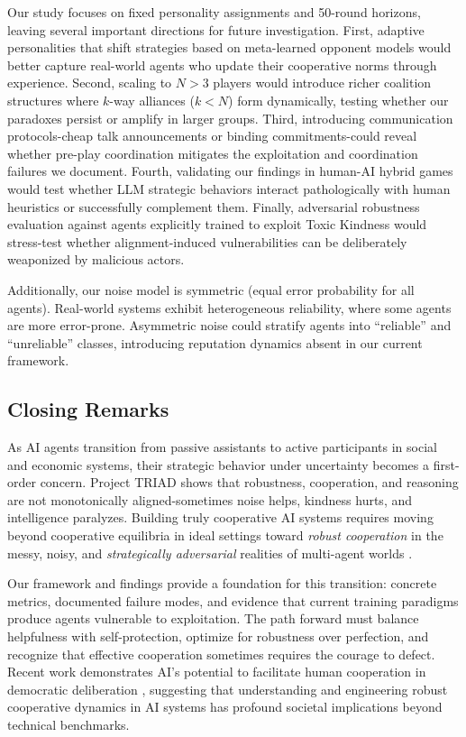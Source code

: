 \documentclass{uai2026} %
\begin{document}
Our study focuses on fixed personality assignments and 50-round horizons, leaving several important directions for future investigation. First, adaptive personalities that shift strategies based on meta-learned opponent models would better capture real-world agents who update their cooperative norms through experience. Second, scaling to $N>3$ players would introduce richer coalition structures where $k$-way alliances ($k < N$) form dynamically, testing whether our paradoxes persist or amplify in larger groups. Third, introducing communication protocols-cheap talk announcements or binding commitments-could reveal whether pre-play coordination mitigates the exploitation and coordination failures we document. Fourth, validating our findings in human-AI hybrid games would test whether LLM strategic behaviors interact pathologically with human heuristics or successfully complement them. Finally, adversarial robustness evaluation against agents explicitly trained to exploit Toxic Kindness would stress-test whether alignment-induced vulnerabilities can be deliberately weaponized by malicious actors.

Additionally, our noise model is symmetric (equal error probability for all agents). Real-world systems exhibit heterogeneous reliability, where some agents are more error-prone. Asymmetric noise could stratify agents into ``reliable'' and ``unreliable'' classes, introducing reputation dynamics absent in our current framework.

\subsection{Closing Remarks}

As AI agents transition from passive assistants to active participants in social and economic systems, their strategic behavior under uncertainty becomes a first-order concern. Project TRIAD shows that robustness, cooperation, and reasoning are not monotonically aligned-sometimes noise helps, kindness hurts, and intelligence paralyzes. Building truly cooperative AI systems requires moving beyond cooperative equilibria in ideal settings toward \textit{robust cooperation} in the messy, noisy, and \textit{strategically adversarial} realities of multi-agent worlds \citep{hausken2024review,etesami2019dynamic}.

Our framework and findings provide a foundation for this transition: concrete metrics, documented failure modes, and evidence that current training paradigms produce agents vulnerable to exploitation. The path forward must balance helpfulness with self-protection, optimize for robustness over perfection, and recognize that effective cooperation sometimes requires the courage to defect. Recent work demonstrates AI's potential to facilitate human cooperation in democratic deliberation \citep{tessler2024ai}, suggesting that understanding and engineering robust cooperative dynamics in AI systems has profound societal implications beyond technical benchmarks.
\end{document}
